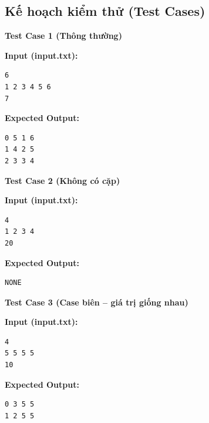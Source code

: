 \subsection{Kế hoạch kiểm thử (Test Cases)}

\textbf{Test Case 1 (Thông thường)}

\textbf{Input (input.txt):}
\begin{lstlisting}
6
1 2 3 4 5 6
7
\end{lstlisting}

\textbf{Expected Output:}
\begin{lstlisting}
0 5 1 6
1 4 2 5
2 3 3 4
\end{lstlisting}

\vspace{0.5cm}

\textbf{Test Case 2 (Không có cặp)}

\textbf{Input (input.txt):}
\begin{lstlisting}
4
1 2 3 4
20
\end{lstlisting}

\textbf{Expected Output:}
\begin{lstlisting}
NONE
\end{lstlisting}

\vspace{0.5cm}

\textbf{Test Case 3 (Case biên -- giá trị giống nhau)}

\textbf{Input (input.txt):}
\begin{lstlisting}
4
5 5 5 5
10
\end{lstlisting}

\textbf{Expected Output:}
\begin{lstlisting}
0 3 5 5
1 2 5 5
\end{lstlisting}